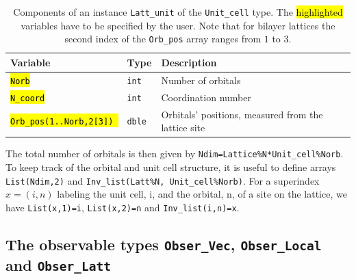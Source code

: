 
\begin{table}[h!]
	\begin{center}
   \begin{tabular}{@{} l l l @{}}\toprule
    Variable                              & Type          & Description \\\midrule
    \hl{\texttt{Norb}}                    & \texttt{int}  & Number of orbitals \\
    \hl{\texttt{N\_coord}}                & \texttt{int}  & Coordination number \\
    \hl{\texttt{Orb\_pos(1..Norb,2[3]) }} & \texttt{dble} & Orbitals' positions, measured from the lattice site  \\\bottomrule
   \end{tabular}
     \caption{Components of an instance \texttt{Latt\_unit} of the \texttt{Unit\_cell} type.
   The \hl{highlighted} variables have to be specified by the user. Note that for bilayer lattices the second index of the \texttt{Orb\_pos} array  ranges from $1$ to $3$.  } 
    \label{table:unit_cell}
\end{center}
\end{table}

The total  number of orbitals  is then given by \texttt{Ndim=Lattice\%N*Unit\_cell\%Norb}.  To keep track of the orbital and  unit cell structure, it is useful to define arrays 
\texttt{List(Ndim,2)}  and \texttt{Inv\_list(Latt\%N, Unit\_cell\%Norb)}.  For a superindex $x = (i,n)$ labeling the unit cell, i,  and the orbital, n, of a site on the lattice, we have 
\texttt{List(x,1)=i}, \texttt{List(x,2)=n}  and \texttt{Inv\_list(i,n)=x}. 


\subsection{The observable types \texttt{Obser\_Vec}, \texttt{Obser\_Local} and \texttt{Obser\_Latt}}\label{sec:obs}

